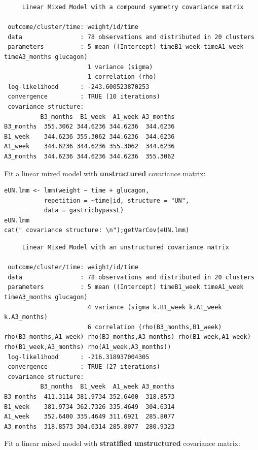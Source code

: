 \documentclass[12pt]{article}
\begin{document}
\begin{verbatim}
     Linear Mixed Model with a compound symmetry covariance matrix 

 outcome/cluster/time: weight/id/time 
 data                : 78 observations and distributed in 20 clusters 
 parameters          : 5 mean ((Intercept) timeB1_week timeA1_week timeA3_months glucagon) 
                       1 variance (sigma) 
                       1 correlation (rho) 
 log-likelihood      : -243.600523870253 
 convergence         : TRUE (10 iterations)
 covariance structure: 
          B3_months  B1_week  A1_week A3_months
B3_months  355.3062 344.6236 344.6236  344.6236
B1_week    344.6236 355.3062 344.6236  344.6236
A1_week    344.6236 344.6236 355.3062  344.6236
A3_months  344.6236 344.6236 344.6236  355.3062
\end{verbatim}


\noindent Fit a linear mixed model with \textbf{unstructured} covariance matrix:

\lstset{language=r,label= ,caption= ,captionpos=b,numbers=none}
\begin{lstlisting}
eUN.lmm <- lmm(weight ~ time + glucagon,
	       repetition = ~time|id, structure = "UN",
	       data = gastricbypassL)
eUN.lmm
cat(" covariance structure: \n");getVarCov(eUN.lmm)
\end{lstlisting}

\begin{verbatim}
     Linear Mixed Model with an unstructured covariance matrix 

 outcome/cluster/time: weight/id/time 
 data                : 78 observations and distributed in 20 clusters 
 parameters          : 5 mean ((Intercept) timeB1_week timeA1_week timeA3_months glucagon) 
                       4 variance (sigma k.B1_week k.A1_week k.A3_months) 
                       6 correlation (rho(B3_months,B1_week) rho(B3_months,A1_week) rho(B3_months,A3_months) rho(B1_week,A1_week) rho(B1_week,A3_months) rho(A1_week,A3_months)) 
 log-likelihood      : -216.318937004305 
 convergence         : TRUE (27 iterations)
 covariance structure: 
          B3_months  B1_week  A1_week A3_months
B3_months  411.3114 381.9734 352.6400  318.8573
B1_week    381.9734 362.7326 335.4649  304.6314
A1_week    352.6400 335.4649 311.6921  285.8077
A3_months  318.8573 304.6314 285.8077  280.9323
\end{verbatim}

\clearpage

\noindent Fit a linear mixed model with \textbf{stratified unstructured} covariance matrix:
\end{document}
